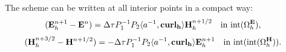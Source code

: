\documentclass[12pt,reqno]{amsart}
\newcommand{\acurl}{\langle a^{-1},{\bf curl_h}\rangle}
\newcommand{\e}{{\bf E}}
\newcommand{\h}{{\bf H}}
\theoremstyle{definition}
\numberwithin{equation}{section}
\newcommand{\intr}[1]{\mathrm{int}(#1)}
\def\Gwh{\Omega_h}
\begin{document}
The scheme can be written at all interior points in a compact way:	
\begin{align}\label{eq:c1}
	&
	(\e_h^{n+1} -\e^{n})=
	\Delta \tau P_1^{-1} P_2 \acurl \h_h^{n+1/2}
			 \quad \mathrm{in} \  \intr{\Gwh^\e},
\end{align}
\begin{align}\label{eq:c2}
	&
	(\h_h^{n+3/2} -\h^{n+1/2})
	=
	-\Delta \tau P_1^{-1}P_2 \acurl \e_h^{n+1}
	 \quad \mathrm{in} \  \intr{\intr{\Gwh^\h}}.
\end{align}
\end{document}
